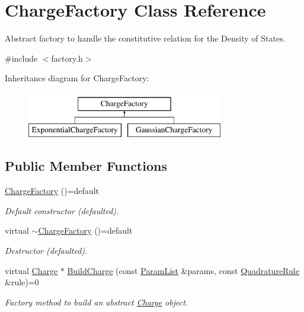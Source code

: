 \hypertarget{classChargeFactory}{\section{Charge\-Factory Class Reference}
\label{classChargeFactory}
}


Abstract factory to handle the constitutive relation for the Density of States.  




{\ttfamily \#include $<$factory.\-h$>$}

Inheritance diagram for Charge\-Factory\-:\begin{figure}[H]
\begin{center}
\leavevmode
\includegraphics[height=2.000000cm]{classChargeFactory}
\end{center}
\end{figure}
\subsection*{Public Member Functions}
\begin{DoxyCompactItemize}
\item 
\hypertarget{classChargeFactory_ac9cd065aedc271933d5d9ee8f82bc76b}{\hyperlink{classChargeFactory_ac9cd065aedc271933d5d9ee8f82bc76b}{Charge\-Factory} ()=default}\label{classChargeFactory_ac9cd065aedc271933d5d9ee8f82bc76b}

\begin{DoxyCompactList}\small\item\em Default constructor (defaulted). \end{DoxyCompactList}\item 
\hypertarget{classChargeFactory_a311f54993f661651542b1fb5cec17692}{virtual \hyperlink{classChargeFactory_a311f54993f661651542b1fb5cec17692}{$\sim$\-Charge\-Factory} ()=default}\label{classChargeFactory_a311f54993f661651542b1fb5cec17692}

\begin{DoxyCompactList}\small\item\em Destructor (defaulted). \end{DoxyCompactList}\item 
virtual \hyperlink{classCharge}{Charge} $\ast$ \hyperlink{classChargeFactory_ad4b190a88028e2e195fc5c5a4cfdcf70}{Build\-Charge} (const \hyperlink{classParamList}{Param\-List} \&params, const \hyperlink{classQuadratureRule}{Quadrature\-Rule} \&rule)=0
\begin{DoxyCompactList}\small\item\em Factory method to build an abstract \hyperlink{classCharge}{Charge} object. \end{DoxyCompactList}\end{DoxyCompactItemize}


